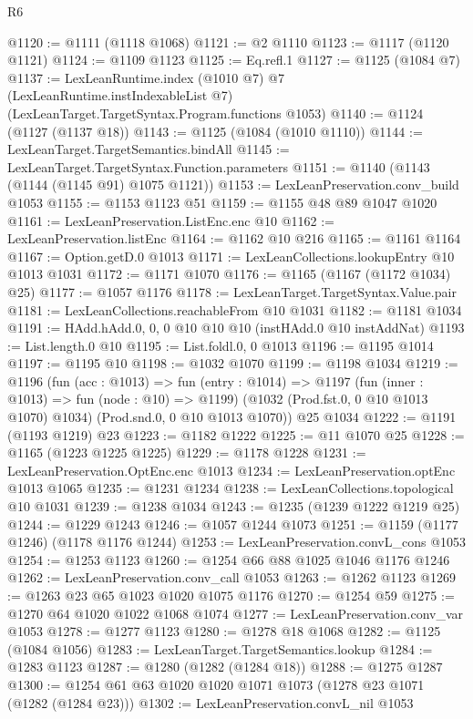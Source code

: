 \begin{lexlean}{R6}
\begin{coremodule}
{{{{{{{{{{{{{{{{{{{{@1120 := @1111 (@1118 @1068)
@1121 := @2 @1110
@1123 := @1117 (@1120 @1121)
@1124 := @1109 @1123
@1125 := Eq.refl.{1}
@1127 := @1125 (@1084 @7)
@1137 := LexLeanRuntime.index
    (@1010 @7)
    @7
    (LexLeanRuntime.instIndexableList @7)
    (LexLeanTarget.TargetSyntax.Program.functions @1053)
@1140 := @1124 (@1127 (@1137 @18))
@1143 := @1125 (@1084 (@1010 @1110))
@1144 := LexLeanTarget.TargetSemantics.bindAll
@1145 := LexLeanTarget.TargetSyntax.Function.parameters
@1151 := @1140 (@1143 (@1144 (@1145 @91) @1075 @1121))
@1153 := LexLeanPreservation.conv_build @1053
@1155 := @1153 @1123 @51
@1159 := @1155 @48 @89 @1047 @1020
@1161 := LexLeanPreservation.ListEnc.enc @10
@1162 := LexLeanPreservation.listEnc
@1164 := @1162 @10 @216
@1165 := @1161 @1164
@1167 := Option.getD.{0} @1013
@1171 := LexLeanCollections.lookupEntry @10 @1013 @1031
@1172 := @1171 @1070
@1176 := @1165 (@1167 (@1172 @1034) @25)
@1177 := @1057 @1176
@1178 := LexLeanTarget.TargetSyntax.Value.pair
@1181 := LexLeanCollections.reachableFrom @10 @1031
@1182 := @1181 @1034
@1191 := HAdd.hAdd.{0, 0, 0} @10 @10 @10 (instHAdd.{0} @10 instAddNat)
@1193 := List.length.{0} @10
@1195 := List.foldl.{0, 0} @1013
@1196 := @1195 @1014
@1197 := @1195 @10
@1198 := @1032 @1070
@1199 := @1198 @1034
@1219 := @1196
    (fun (acc : @1013) =>
    fun (entry : @1014) =>
    @1197
      (fun (inner : @1013) => fun (node : @10) => @1199)
      (@1032 (Prod.fst.{0, 0} @10 @1013 @1070) @1034)
      (Prod.snd.{0, 0} @10 @1013 @1070))
    @25
    @1034
@1222 := @1191 (@1193 @1219) @23
@1223 := @1182 @1222
@1225 := @11 @1070 @25
@1228 := @1165 (@1223 @1225 @1225)
@1229 := @1178 @1228
@1231 := LexLeanPreservation.OptEnc.enc @1013
@1234 := LexLeanPreservation.optEnc @1013 @1065
@1235 := @1231 @1234
@1238 := LexLeanCollections.topological @10 @1031
@1239 := @1238 @1034
@1243 := @1235 (@1239 @1222 @1219 @25)
@1244 := @1229 @1243
@1246 := @1057 @1244 @1073
@1251 := @1159 (@1177 @1246) (@1178 @1176 @1244)
@1253 := LexLeanPreservation.convL_cons @1053
@1254 := @1253 @1123
@1260 := @1254 @66 @88 @1025 @1046 @1176 @1246
@1262 := LexLeanPreservation.conv_call @1053
@1263 := @1262 @1123
@1269 := @1263 @23 @65 @1023 @1020 @1075 @1176
@1270 := @1254 @59
@1275 := @1270 @64 @1020 @1022 @1068 @1074
@1277 := LexLeanPreservation.conv_var @1053
@1278 := @1277 @1123
@1280 := @1278 @18 @1068
@1282 := @1125 (@1084 @1056)
@1283 := LexLeanTarget.TargetSemantics.lookup
@1284 := @1283 @1123
@1287 := @1280 (@1282 (@1284 @18))
@1288 := @1275 @1287
@1300 := @1254 @61 @63 @1020 @1020 @1071 @1073 (@1278 @23 @1071 (@1282 (@1284 @23)))
@1302 := LexLeanPreservation.convL_nil @1053
}}}}}}}}}}}}}}}}}}}}
\end{coremodule}
\end{lexlean}
